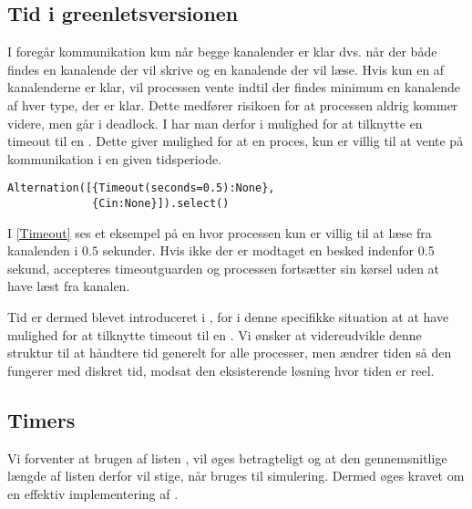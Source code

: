 
\subsection{Tid i greenletsversionen} 
I \pycsp foregår kommunikation
kun når begge kanalender er klar dvs. når der både findes en
kanalende der vil skrive og en kanalende der vil læse. Hvis
kun en af kanalenderne er klar, vil processen vente indtil der findes
minimum en kanalende af hver type, der er klar. Dette medfører
risikoen for at processen aldrig kommer videre, men går i deadlock.
I \pycsp har man derfor i  mulighed for at
tilknytte en timeout til en . Dette giver mulighed for
at en proces, kun er villig til at vente på kommunikation i en
given tidsperiode. 
\begin{lstlisting}[float=hbtp, label=Timeout,caption=Timeout i Alternation (fra dokumentationen til PyCSP)]
Alternation([{Timeout(seconds=0.5):None}, 
             {Cin:None}]).select()
\end{lstlisting}

I \cref{Timeout} ses et eksempel på en  hvor processen kun er villig
til at læse fra kanalenden  i $0.5$ sekunder. Hvis ikke der
er modtaget en besked indenfor 0.5 sekund, accepteres timeoutguarden
og processen fortsætter sin kørsel uden at have læst fra kanalen.

Tid er dermed blevet introduceret i \pycsp, for i denne specifikke situation at at have
mulighed for at tilknytte timeout til en . Vi ønsker
at videreudvikle denne struktur til at håndtere tid generelt for alle
processer, men ændrer tiden så den fungerer med diskret tid, modsat den eksisterende
løsning hvor tiden er reel.

\subsection{Timers}  
Vi forventer at brugen af
listen , vil øges betragteligt og at den gennemsnitlige
længde af listen derfor vil stige, når \pycsp bruges til simulering. Dermed 
øges kravet om en effektiv implementering af . 

